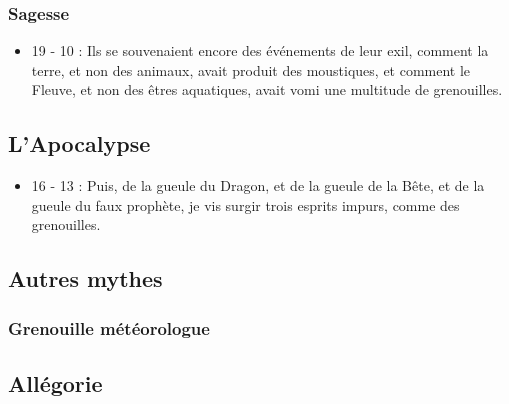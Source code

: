 \subsubsection{Sagesse}
\begin{itemize}
\item 19 - 10 : Ils se souvenaient encore des événements de leur exil, comment la terre, et non des animaux, avait produit des moustiques, et comment le Fleuve, et non des êtres aquatiques, avait vomi une multitude de grenouilles.
\end{itemize}
\subsection{L'Apocalypse}
\begin{itemize}
\item 16 - 13 : Puis, de la gueule du Dragon, et de la gueule de la Bête, et de la gueule du faux prophète, je vis surgir trois esprits impurs, comme des grenouilles.
\end{itemize}
\subsection{Autres mythes}
\subsubsection{Grenouille météorologue}
\subsection{Allégorie}

